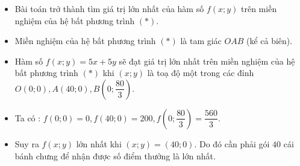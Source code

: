 \begin{bt}
{\begin{itemize}
			\item Bài toán trở thành tìm giá trị lớn nhất của hàm số $ f(x;y) $ trên miền nghiệm của hệ bất phương trình $ (*) $.
			\item Miền nghiệm của hệ bất phương trình $ (*) $ là tam giác $ OAB $ (kể cả biên).
			\item Hàm số $ f(x;y)=5x+5y $ sẽ đạt giá trị lớn nhất
			trên miền nghiệm của hệ bất phương trình $ (*) $ khi $ (x;y) $ là toạ độ một trong các đỉnh $ O(0;0), A(40;0), B\left(0;\dfrac{80}{3}\right) $.
			\item Ta có : $ f(0;0)=0, f(40;0)=200, f\left(0;\dfrac{80}{3}\right)=\dfrac{560}{3}. $
			\item Suy ra $ f(x;y) $ lớn nhất khi $ (x;y) =(40;0)$.  Do đó cần phải gói $ 40 $ cái bánh chưng để nhận được
			số điểm thưởng là lớn nhất.
		\end{itemize}
	}
\end{bt}

